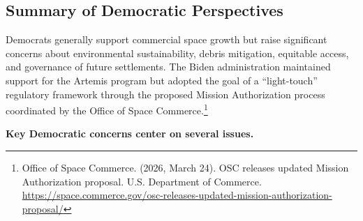 \subsection{Summary of Democratic Perspectives}

Democrats generally support commercial space growth but raise significant concerns about environmental sustainability, debris mitigation, equitable access, and governance of future settlements. The Biden administration maintained support for the Artemis program but adopted the goal of a “light-touch” regulatory framework through the proposed Mission Authorization process coordinated by the Office of Space Commerce.\footnote{Office of Space Commerce. (2026, March 24). OSC releases updated Mission Authorization proposal. U.S. Department of Commerce. \url{https://space.commerce.gov/osc-releases-updated-mission-authorization-proposal/}}

\textbf{Key Democratic concerns center on several issues.}

